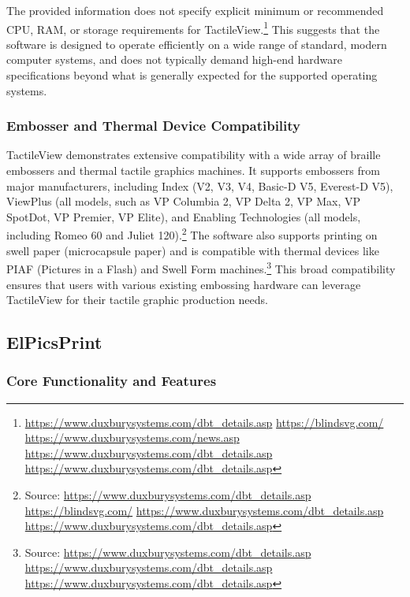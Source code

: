 The provided information does not specify explicit minimum or recommended CPU, RAM, or storage requirements for TactileView.\footnote{\url{https://www.duxburysystems.com/dbt_details.asp} \url{https://blindsvg.com/} \url{https://www.duxburysystems.com/news.asp} \url{https://www.duxburysystems.com/dbt_details.asp} \url{https://www.duxburysystems.com/dbt_details.asp}} This suggests that the software is designed to operate efficiently on a wide range of standard, modern computer systems, and does not typically demand high-end hardware specifications beyond what is generally expected for the supported operating systems.

\subsubsection{Embosser and Thermal Device Compatibility}

TactileView demonstrates extensive compatibility with a wide array of braille embossers and thermal tactile graphics machines. It supports embossers from major manufacturers, including Index (V2, V3, V4, Basic-D V5, Everest-D V5), ViewPlus (all models, such as VP Columbia 2, VP Delta 2, VP Max, VP SpotDot, VP Premier, VP Elite), and Enabling Technologies (all models, including Romeo 60 and Juliet 120).\footnote{Source:  \url{https://www.duxburysystems.com/dbt_details.asp} \url{https://blindsvg.com/} \url{https://www.duxburysystems.com/dbt_details.asp} \url{https://www.duxburysystems.com/dbt_details.asp}} The software also supports printing on swell paper (microcapsule paper) and is compatible with thermal devices like PIAF (Pictures in a Flash) and Swell Form machines.\footnote{Source:  \url{https://www.duxburysystems.com/dbt_details.asp} \url{https://www.duxburysystems.com/dbt_details.asp} \url{https://www.duxburysystems.com/dbt_details.asp}} This broad compatibility ensures that users with various existing embossing hardware can leverage TactileView for their tactile graphic production needs.

\subsection{ElPicsPrint}

\subsubsection{Core Functionality and Features}

